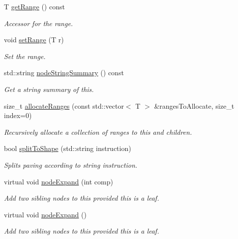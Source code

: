 \begin{DoxyCompactItemize}
\-T \hyperlink{classsubpavings_1_1MappedSPnode_a3e5c6ff11f8640c1a7b3a363e9f841bd}{get\-Range} () const 
\begin{DoxyCompactList}\small\item\em \-Accessor for the range. \end{DoxyCompactList}\item 
void \hyperlink{classsubpavings_1_1MappedSPnode_a4e3cc447b700d1a0e8e611f56762a96d}{set\-Range} (\-T r)
\begin{DoxyCompactList}\small\item\em \-Set the range. \end{DoxyCompactList}\item 
std\-::string \hyperlink{classsubpavings_1_1MappedSPnode_ae4b153a0ff33397c3537f1ce9d87b743}{node\-String\-Summary} () const 
\begin{DoxyCompactList}\small\item\em \-Get a string summary of this. \end{DoxyCompactList}\item 
size\-\_\-t \hyperlink{classsubpavings_1_1MappedSPnode_a3f0d891bb2650f6558cc4081ce5102c6}{allocate\-Ranges} (const std\-::vector$<$ \-T $>$ \&ranges\-To\-Allocate, size\-\_\-t index=0)
\begin{DoxyCompactList}\small\item\em \-Recursively allocate a collection of ranges to this and children. \end{DoxyCompactList}\item 
bool \hyperlink{classsubpavings_1_1MappedSPnode_a65c8bb39917da7dc82fb07c9572c7286}{split\-To\-Shape} (std\-::string instruction)
\begin{DoxyCompactList}\small\item\em \-Splits paving according to string instruction. \end{DoxyCompactList}\item 
virtual void \hyperlink{classsubpavings_1_1MappedSPnode_a817b05cc2d60ff0ee1a98b0addf54131}{node\-Expand} (int comp)
\begin{DoxyCompactList}\small\item\em \-Add two sibling nodes to this provided this is a leaf. \end{DoxyCompactList}\item 
virtual void \hyperlink{classsubpavings_1_1MappedSPnode_a26af7ee7d7e9c00623dea9e6aed02d92}{node\-Expand} ()
\begin{DoxyCompactList}\small\item\em \-Add two sibling nodes to this provided this is a leaf. \end{DoxyCompactList}\end{DoxyCompactItemize}
